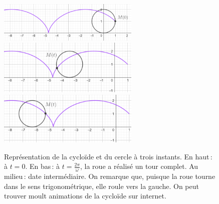 		\begin{figure}
			\includegraphics[width=0.6\textwidth]{image/fct_trigo/cyclo1.png}\\
			\includegraphics[width=0.6\textwidth]{image/fct_trigo/cyclo2.png}\\
			\includegraphics[width=0.6\textwidth]{image/fct_trigo/cyclo3.png}
			\caption{Représentation de la cycloïde et du cercle à trois instants. En haut\,: à $t=0$. En bas\,: à $t=\frac{2\pi}{\omega}$, la roue a réalisé un tour complet. Au milieu\,: date intermédiaire. On remarque que, puisque la roue tourne dans le sens trigonométrique, elle roule vers la gauche. On peut trouver moult animations de la cycloïde sur internet.}
			\label{fig_cyclo}
		\end{figure}

\iffalse
